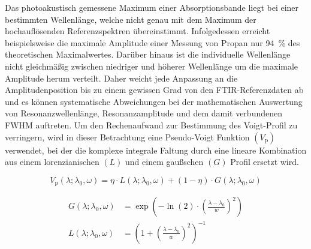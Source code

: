 \par Das photoakustisch gemessene Maximum einer Absorptionsbande liegt bei einer bestimmten Wellenlänge, welche nicht genau mit dem Maximum der hochauflösenden Referenzspektren übereinstimmt.
Infolgedessen erreicht beispielsweise die maximale Amplitude einer Messung von Propan nur \SI{94}{\%} des theoretischen Maximalwertes.
Darüber hinaus ist die individuelle Wellenlänge nicht gleichmäßig zwischen niedriger und höherer Wellenlänge um die maximale Amplitude herum verteilt.
Daher weicht jede Anpassung an die Amplitudenposition bis zu einem gewissen Grad von den \gls{FTIR}-Referenzdaten ab und es können systematische Abweichungen bei der mathematischen Auswertung von Resonanzwellenlänge, Resonanzamplitude und dem damit verbundenen \gls{FWHM} auftreten.
Um den Rechenaufwand zur Bestimmung des Voigt-Profil zu verringern, wird in dieser Betrachtung eine Pseudo-Voigt Funktion $(V_\mathrm{p})$ verwendet, bei der die komplexe integrale Faltung durch eine lineare Kombination aus einem lorenzianischen $(L)$ und einem gaußschen $(G)$ Profil ersetzt wird.

\begin{equation}
    V_\mathrm{p}(\lambda;\lambda_0,\omega) = \eta \cdot L(\lambda;\lambda_0,\omega) + (1 - \eta) \cdot G(\lambda;\lambda_0,\omega)
\end{equation}

\begin{subequations}
    \begin{align}
        G(\lambda;\lambda_0,\omega) &= \exp {\left(-\ln(2) \cdot \left({\frac {\lambda-\lambda_{0}}{w}}\right)^{2}\right)} \\
        L(\lambda;\lambda_0,\omega) &= \left(1+\left(\frac {\lambda-\lambda_0}{w}\right)^2 \right)^{-1}
    \end{align}
\end{subequations}

